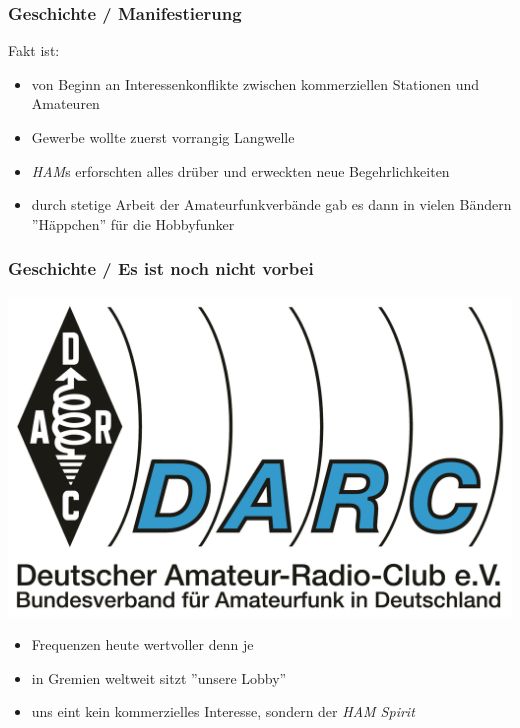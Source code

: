 \begin{frame}
    \frametitle{Geschichte / Manifestierung}

    Fakt ist:

    \begin{itemize}
        \item von Beginn an Interessenkonflikte zwischen kommerziellen Stationen
              und Amateuren
        \item Gewerbe wollte zuerst vorrangig Langwelle
        \item \emph{HAM}s erforschten alles drüber und erweckten neue
              Begehrlichkeiten
        \item durch stetige Arbeit der Amateurfunkverbände gab es dann in
              vielen Bändern ''Häppchen'' für die Hobbyfunker
    \end{itemize}

\end{frame}

\begin{frame}
    \frametitle{Geschichte / Es ist noch nicht vorbei}
 
    \begin{center}
        \includegraphics[height=0.3\textheight]{bv01/DARC_Logo.pdf}
    \end{center}
   
    \begin{itemize}
        \item Frequenzen heute wertvoller denn je
        \item in Gremien weltweit sitzt ''unsere Lobby''
        \item uns eint kein kommerzielles Interesse, sondern der
              \emph{HAM Spirit}\hyperlink{refs}{\cite{wp}}
    \end{itemize}

\end{frame}

